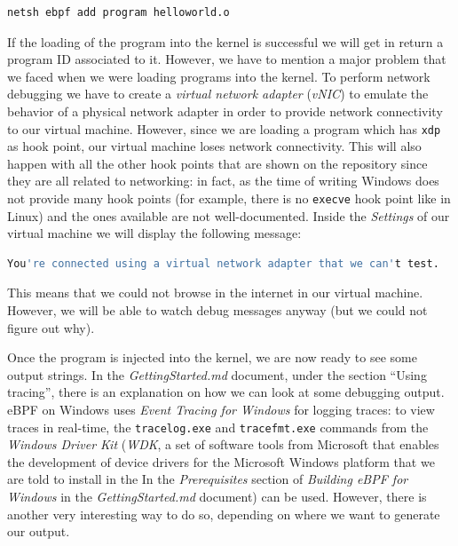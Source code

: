 \begin{lstlisting}[style=commandline, language=bash, caption={``Hello world!'' installation command}]
	netsh ebpf add program helloworld.o
\end{lstlisting}

If the loading of the program into the kernel is successful we will get in return a program ID associated to it.
However, we have to mention a major problem that we faced when we were loading programs into the kernel.
To perform network debugging we have to create a \textit{virtual network adapter} (\textit{vNIC}) to emulate the behavior of a physical network adapter in order to provide network connectivity to our virtual machine.
However, since we are loading a program which has \colorbox{backcolour}{\lstinline[style=cstyle, language=C]|xdp|} as hook point, our virtual machine loses network connectivity.
This will also happen with all the other hook points that are shown on the repository since they are all related to networking: in fact, as the time of writing Windows does not provide many hook points (for example, there is no \colorbox{backcolour}{\lstinline[style=commandline, language=bash]|execve|} hook point like in Linux) and the ones available are not well-documented.
Inside the \textit{Settings} of our virtual machine we will display the following message:

\begin{lstlisting}[style=highlight, language=bash, caption={Network adapter problem}]
	You're connected using a virtual network adapter that we can't test.
\end{lstlisting}

This means that we could not browse in the internet in our virtual machine.
However, we will be able to watch debug messages anyway (but we could not figure out why).

Once the program is injected into the kernel, we are now ready to see some output strings.
In the \textit{GettingStarted.md} document, under the section ``Using tracing'', there is an explanation on how we can look at some debugging output.
eBPF on Windows uses \textit{Event Tracing for Windows} for logging traces: to view traces in real-time, the  \colorbox{backcolour}{\lstinline[style=commandline, language=bash]|tracelog.exe|} and \colorbox{backcolour}{\lstinline[style=commandline, language=bash]|tracefmt.exe|} commands from the \textit{Windows Driver Kit} (\textit{WDK}, a set of software tools from Microsoft that enables the development of device drivers for the Microsoft Windows platform that we are told to install in the In the \textit{Prerequisites} section of \textit{Building eBPF for Windows} in the \textit{GettingStarted.md} document) can be used.  
However, there is another very interesting way to do so, depending on where we want to generate our output.

